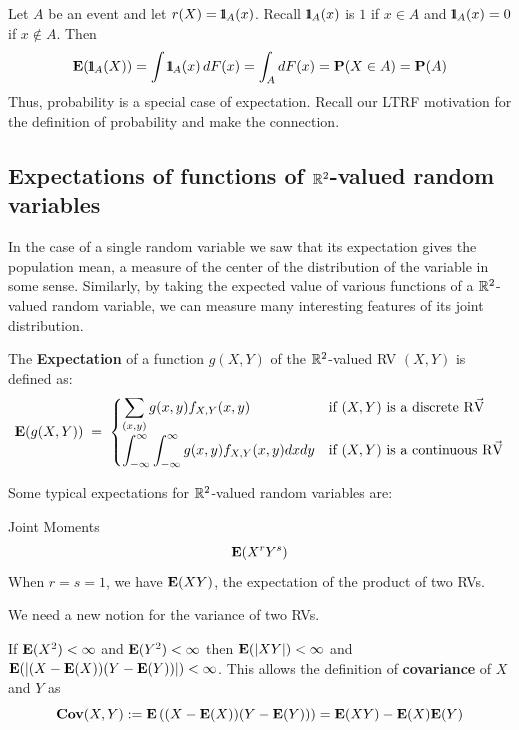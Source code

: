 \begin{example}\label{EgProbIsAnExpectation}
Let $A$ be an event and let $r(X)={1}\mspace{-11 mu}{1}_{A}(x)$.  Recall ${1}\mspace{-11 mu}{1}_A(x)$ is $1$ if $x \in A$ and ${1}\mspace{-11 mu}{1}_A(x)=0$ if $x \notin A$.  Then
\begin{equation}\label{E:ExpectationofIndicator}
\mathbf{E}({1}\mspace{-11 mu}{1}_A(X)) = \int {1}\mspace{-11 mu}{1}_A(x)\, dF(x) = \int_A dF(x) = \mathbf{P}(X \in A) = \mathbf{P}(A)
\end{equation}
Thus, probability is a special case of expectation.  Recall our LTRF motivation for the definition of probability and make the connection.
\end{example}

\subsection*{Expectations of functions of $\mathbb{R}^2$-valued random variables}\label{S:ExpectationsOfFunsOf2RVs}

In the case of a single random variable we saw that its expectation gives the population mean, 
a measure of the center of the distribution of the variable in some sense.  
Similarly, by taking the expected value of various functions of a $\mathbb{R}^2$-valued random variable, we can measure many interesting features of its joint distribution.

\begin{definition}\label{Df:2expectation}
The \textbf{Expectation} of a function $g(X,Y)$ of the $\mathbb{R}^2$-valued RV $(X,Y)$ is defined as:
\[
\mathbf{E}(g(X,Y))\; =\;
\begin{cases}
\displaystyle \sum_{(x,y)} g(x,y) f_{X,Y}(x,y) & \text{if $(X,Y)$ is a discrete {\mbox{R$\vec{\text V}$}}}\\[12pt]
\displaystyle \int_{-\infty}^{\infty} \int_{-\infty}^{\infty} g(x,y) f_{X,Y}(x,y) dx dy & \text{if $(X,Y)$ is a continuous {\mbox{R$\vec{\text V}$}}}
\end{cases}
\]
\end{definition}

Some typical expectations for $\mathbb{R}^2$-valued random variables are:

\be
\item Joint Moments
\[
\mathbf{E}(X^r Y^s)
\]
When $r=s=1$, we have $\mathbf{E}(XY)$, the expectation of the product of two RVs.
\item 
We need a new notion for the variance of two RVs.

If $\mathbf{E}(X^2) < \infty$ and $\mathbf{E}(Y^2) < \infty$ then $\mathbf{E}(|X Y|) < \infty$ and $\mathbf{E}(|(X-\mathbf{E}(X))(Y-\mathbf{E}(Y))|) < \infty$.  This allows the definition of {\bf covariance} of $X$ and $Y$ as
\[
\mathbf{Cov}(X,Y) := \mathbf{E} \left((X-\mathbf{E}(X))(Y-\mathbf{E}(Y))\right) = \mathbf{E}(X Y) - \mathbf{E}(X) \mathbf{E}(Y)
\]
\ee

